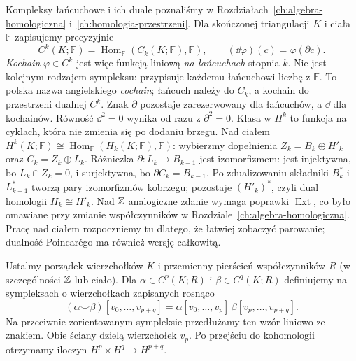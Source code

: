 Kompleksy łańcuchowe i ich duale poznaliśmy
w Rozdziałach~\ref{ch:algebra-homologiczna}
i~\ref{ch:homologia-przestrzeni}. Dla
skończonej triangulacji $K$ i ciała $\mathbb F$
zapisujemy precyzyjnie
\[
 C^k(K;\mathbb F)
   =\operatorname{Hom}_{\mathbb F}
       (C_k(K;\mathbb F),\mathbb F),
 \qquad
 (\dd\varphi)(c)=\varphi(\partial c).
\]
\emph{Kochain} $\varphi\in C^k$ jest więc
funkcją liniową \emph{na łańcuchach} stopnia $k$.
Nie jest kolejnym rodzajem sympleksu:
przypisuje każdemu łańcuchowi liczbę z
$\mathbb F$. To polska nazwa angielskiego
\emph{cochain}; łańcuch należy do $C_k$,
a kochain do przestrzeni dualnej $C^k$.
Znak $\partial$ pozostaje zarezerwowany
dla łańcuchów, a $\dd$ dla kochainów.
Równość $\dd^2=0$ wynika od razu z
$\partial^2=0$. Klasa w $H^k$ to
funkcja na cyklach, która nie zmienia
się po dodaniu brzegu. Nad ciałem
$H^k(K;\mathbb F)\cong
\operatorname{Hom}_{\mathbb F}(H_k(K;\mathbb F),\mathbb F)$:
wybierzmy dopełnienia $Z_k=B_k\oplus H'_k$
oraz $C_k=Z_k\oplus L_k$.
Różniczka $\partial:L_k\to B_{k-1}$ jest izomorfizmem:
jest injektywna, bo $L_k\cap Z_k=0$, i surjektywna,
bo $\partial C_k=B_{k-1}$.
Po zdualizowaniu składniki $B_k^*$ i $L_{k+1}^*$
tworzą pary izomorfizmów kobrzegu; pozostaje $(H'_k)^*$,
czyli dual homologii $H_k\cong H'_k$.
Nad $\mathbb{Z}$ analogiczne zdanie
wymaga poprawki $\operatorname{Ext}$,
co było omawiane przy zmianie
współczynników w Rozdziale~\ref{ch:algebra-homologiczna}.
Pracę nad ciałem rozpoczniemy tu dlatego,
że łatwiej zobaczyć parowanie;
dualność Poincarégo ma również
wersję całkowitą.

\begin{definicja}
\label{def:kubek-16}
Ustalmy porządek wierzchołków $K$ i przemienny
pierścień współczynników $R$ (w szczególności $\mathbb{Z}$ lub ciało).
Dla $\alpha\in C^p(K;R)$ i $\beta\in C^q(K;R)$ definiujemy
na sympleksach o wierzchołkach zapisanych rosnąco
\[
(\alpha\smile\beta)
 [v_0,\ldots,v_{p+q}]
=\alpha[v_0,\ldots,v_p]\,
 \beta[v_p,\ldots,v_{p+q}].
\]
Na przeciwnie zorientowanym sympleksie przedłużamy ten
wzór liniowo ze znakiem. Obie ściany dzielą wierzchołek $v_p$.
Po przejściu do kohomologii otrzymamy
iloczyn $H^p\times H^q\to H^{p+q}$.
\end{definicja}

